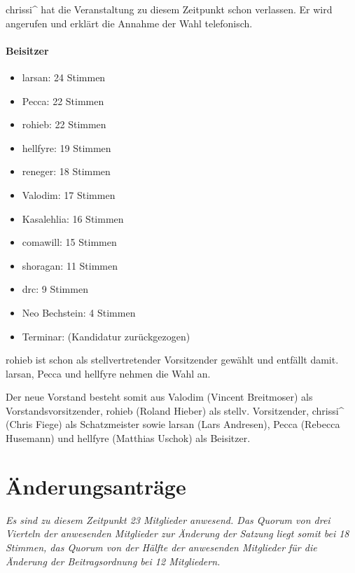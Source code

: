 \documentclass[a4paper,12pt]{scrartcl}
\begin{document}
chrissi\textasciicircum{} hat die Veranstaltung zu diesem Zeitpunkt
schon verlassen. Er wird angerufen und erklärt die Annahme der Wahl telefonisch.

\paragraph{Beisitzer}
\begin{itemize}
  \item larsan: 24 Stimmen
  \item Pecca: 22 Stimmen
  \item rohieb: 22 Stimmen
  \item hellfyre: 19 Stimmen
  \item reneger: 18 Stimmen
  \item Valodim: 17 Stimmen
  \item Kasalehlia: 16 Stimmen
  \item comawill: 15 Stimmen
  \item shoragan: 11 Stimmen
  \item drc: 9 Stimmen
  \item Neo Bechstein: 4 Stimmen
  \item Terminar: (Kandidatur zurückgezogen)
\end{itemize}

rohieb ist schon als stellvertretender Vorsitzender gewählt und entfällt damit.
larsan, Pecca und hellfyre nehmen die Wahl an.

Der neue Vorstand besteht somit aus Valodim (Vincent Breitmoser) als
Vorstandsvorsitzender, rohieb (Roland Hieber) als stellv. Vorsitzender,
chrissi\textasciicircum{} (Chris Fiege) als Schatzmeister sowie larsan (Lars
Andresen), Pecca (Rebecca Husemann) und hellfyre (Matthias Uschok) als
Beisitzer.

\section{Änderungsanträge}

\emph{Es sind zu diesem Zeitpunkt 23 Mitglieder anwesend. Das Quorum von drei
Vierteln der anwesenden Mitglieder zur Änderung der Satzung liegt somit bei 18
Stimmen, das Quorum von der Hälfte der anwesenden Mitglieder für die Änderung
der Beitragsordnung bei 12 Mitgliedern.}
\end{document}
